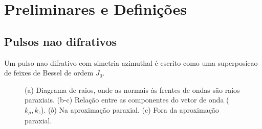 \chapter{Preliminares e Defini\c{c}\~{o}es}

\section{Pulsos nao difrativos}

Um pulso nao difrativo com simetria azimuthal \'e escrito como uma superposicao
de feixes de Bessel de ordem $J_0$.



\begin{figure}[ht]
\centering
{}
\caption{(a) Diagrama de raios, onde as normais às frentes de ondas são raios paraxiais. (b-c) Relação entre as componentes do vetor de onda ($k_{\rho}, k_z$). ($b$) Na aproximação paraxial. (c) Fora da aproximação paraxial.}
\label{figz}
\end{figure}

